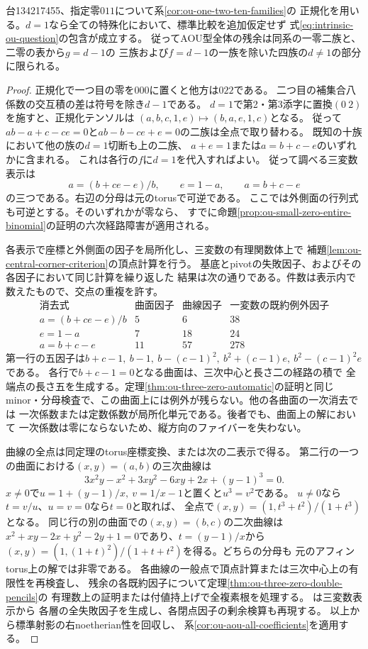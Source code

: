 \begin{theorem}[二零台で二つの補集合二項式が同時に成立する場合]
\label{thm:ou-two-zero-double-binomial}
台134217455、指定零$011$について系\ref{cor:ou-one-two-ten-families}の
正規化を用いる。$d=1$なら全ての特殊化において、標準比較を追加仮定せず
式\eqref{eq:intrinsic-ou-question}の包含が成立する。
従ってAOU型全体の残余は同系の一零二族と、二零の表から$g=d-1$の
三族および$f=d-1$の一族を除いた四族の$d\ne1$の部分に限られる。
\end{theorem}
\begin{proof}
正規化で一つ目の零を$000$に置くと他方は$022$である。
二つ目の補集合八係数の交互積の差は符号を除き$d-1$である。
$d=1$で第2・第3添字に置換$(0\ 2)$を施すと、正規化テンソルは
$(a,b,c,1,e)\mapsto(b,a,e,1,c)$となる。
従って$ab-a+c-ce=0$と$ab-b-ce+e=0$の二族は全点で取り替わる。
既知の十族において他の族の$d=1$切断も上の二族、
$a+e=1$または$a=b+c-e$のいずれかに含まれる。
これは各行の$f$に$d=1$を代入すればよい。
従って調べる三変数表示は
\[
  a=(b+ce-e)/b,\qquad e=1-a,\qquad a=b+c-e
\]
の三つである。右辺の分母は元のtorusで可逆である。
ここでは外側面の行列式も可逆とする。そのいずれかが零なら、
すでに命題\ref{prop:ou-small-zero-entire-binomial}の証明の六次経路障害が適用される。

各表示で座標と外側面の因子を局所化し、三変数の有理関数体上で
補題\ref{lem:ou-central-corner-criterion}の頂点計算を行う。
基底とpivotの失敗因子、およびその各因子において同じ計算を繰り返した
結果は次の通りである。件数は表示内で数えたもので、交点の重複を許す。
\[
\begin{array}{c|r|r|r}
\text{消去式}&\text{曲面因子}&\text{曲線因子}&\text{一変数の既約例外因子}\\\hline
 a=(b+ce-e)/b&5&6&38\\
 e=1-a&7&18&24\\
 a=b+c-e&11&57&278
\end{array}
\]
第一行の五因子は$b+c-1,\ b-1,\ b-(c-1)^2,\ b^2+(c-1)e,\ b^2-(c-1)^2e$である。
各行で$b+c-1=0$となる曲面は、三次中心と長さ二の経路の積で
全端点の長さ五を生成する。定理\ref{thm:ou-three-zero-automatic}の証明と同じ
minor・分母検査で、この曲面上には例外が残らない。他の各曲面の一次消去では
一次係数または定数係数が局所化単元である。後者でも、曲面上の解において
一次係数は零にならないため、縦方向のファイバーを失わない。

曲線の全点は同定理のtorus座標変換、または次の二表示で得る。
第二行の一つの曲面における$(x,y)=(a,b)$の三次曲線は
\[
 3x^2y-x^2+3xy^2-6xy+2x+(y-1)^3=0.
\]
$x\ne0$で$u=1+(y-1)/x,\ v=1/x-1$と置くと$u^3=v^2$である。
$u\ne0$なら$t=v/u$、$u=v=0$なら$t=0$と取れば、
全点で$(x,y)=(1,t^3+t^2)/(1+t^3)$となる。
同じ行の別の曲面での$(x,y)=(b,c)$の二次曲線は
$x^2+xy-2x+y^2-2y+1=0$であり、$t=(y-1)/x$から
$(x,y)=(1,(1+t)^2)/(1+t+t^2)$を得る。どちらの分母も
元のアフィンtorus上の解では非零である。
各曲線の一般点で頂点計算または三次中心上の有限性を再検査し、
残余の各既約因子について定理\ref{thm:ou-three-zero-double-pencils}の
有理数上の証明または付値持上げで全複素根を処理する。
は三変数表示から
各層の全失敗因子を生成し、各閉点因子の剰余検算も再現する。
以上から標準射影の右noetherian性を回収し、
系\ref{cor:ou-aou-all-coefficients}を適用する。
\end{proof}

